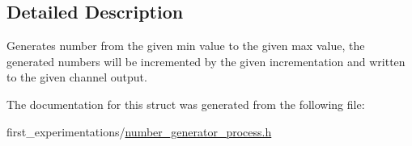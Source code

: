 \subsection{Detailed Description}
Generates number from the given min value to the given max value, the generated numbers will be incremented by the given incrementation and written to the given channel output. 

The documentation for this struct was generated from the following file\-:\begin{DoxyCompactItemize}
\item 
first\-\_\-experimentations/\hyperlink{number__generator__process_8h}{number\-\_\-generator\-\_\-process.\-h}\end{DoxyCompactItemize}
